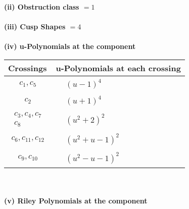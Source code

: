 \documentclass[1p]{elsarticle_modified}
\theoremstyle{definition}
\begin{document}
\flushleft \textbf{(ii) Obstruction class $= 1$}\\~\\
\flushleft \textbf{(iii) Cusp Shapes $= 4$}\\~\\
\newpage\renewcommand{\arraystretch}{1}
\flushleft \textbf{(iv) u-Polynomials at the component}\newline \\
\begin{tabular}{m{50pt}|m{274pt}}
Crossings & \hspace{64pt}u-Polynomials at each crossing \\
\hline $$\begin{aligned}c_{1},c_{5}\end{aligned}$$&$\begin{aligned}
&(u-1)^4
\end{aligned}$\\
\hline $$\begin{aligned}c_{2}\end{aligned}$$&$\begin{aligned}
&(u+1)^4
\end{aligned}$\\
\hline $$\begin{aligned}c_{3},c_{4},c_{7}\\c_{8}\end{aligned}$$&$\begin{aligned}
&(u^2+2)^2
\end{aligned}$\\
\hline $$\begin{aligned}c_{6},c_{11},c_{12}\end{aligned}$$&$\begin{aligned}
&(u^2+u-1)^2
\end{aligned}$\\
\hline $$\begin{aligned}c_{9},c_{10}\end{aligned}$$&$\begin{aligned}
&(u^2- u-1)^2
\end{aligned}$\\
\hline
\end{tabular}\\~\\
\newpage\renewcommand{\arraystretch}{1}
\flushleft \textbf{(v) Riley Polynomials at the component}\newline \\
\end{document}
